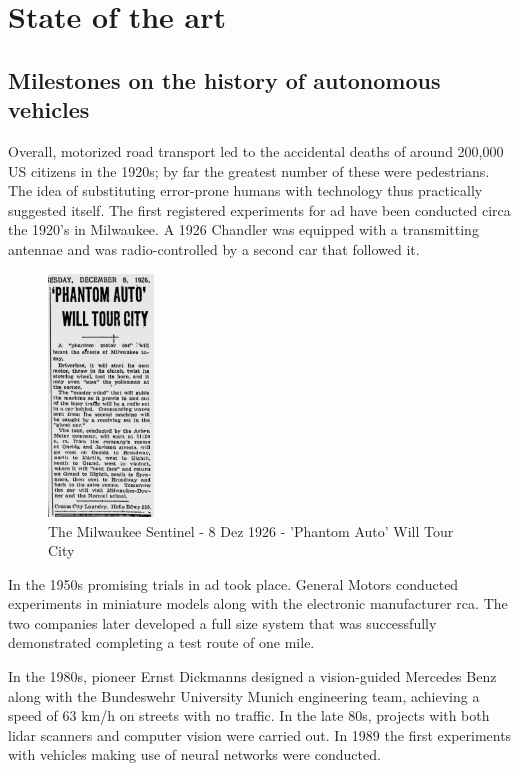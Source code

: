 \chapter{State of the art}

\section{Milestones on the history of autonomous vehicles}

Overall, motorized road transport led to the accidental deaths of around 200,000 US citizens in the 1920s; by far the greatest number of these were pedestrians. \cite{Kroger2016} The idea of substituting error-prone humans with technology thus practically suggested itself. The first registered experiments for \gls{ad} have been conducted circa the 1920's  \cite{TheMilwaukeeSentinel} in Milwaukee. A 1926 Chandler was equipped with a transmitting antennae and was radio-controlled by a second car that followed it.

\begin{figure}[htp]
	
	\centering
	\includegraphics[width=0.25\textwidth]{capstate/imgs/jornal.png}
	
	\caption{The Milwaukee Sentinel - 8 Dez 1926 - 'Phantom Auto' Will Tour City}
	\label{fig:waymo}
	
\end{figure}

In the 1950s promising trials in \gls{ad} took place. General Motors conducted experiments in miniature models along with the electronic manufacturer \gls{rca}. The two companies later developed a full size system that was successfully demonstrated completing a test route of one mile.  \cite{Kroger2016}

In the 1980s, pioneer Ernst Dickmanns designed a vision-guided Mercedes Benz along with the Bundeswehr University Munich engineering team, achieving a speed of 63 km/h on streets with no traffic. In the late 80s, projects with both \gls{lidar} scanners and computer vision were carried out. In 1989 the first experiments with vehicles making use of neural networks were conducted. \cite{Pomerleau1989}

